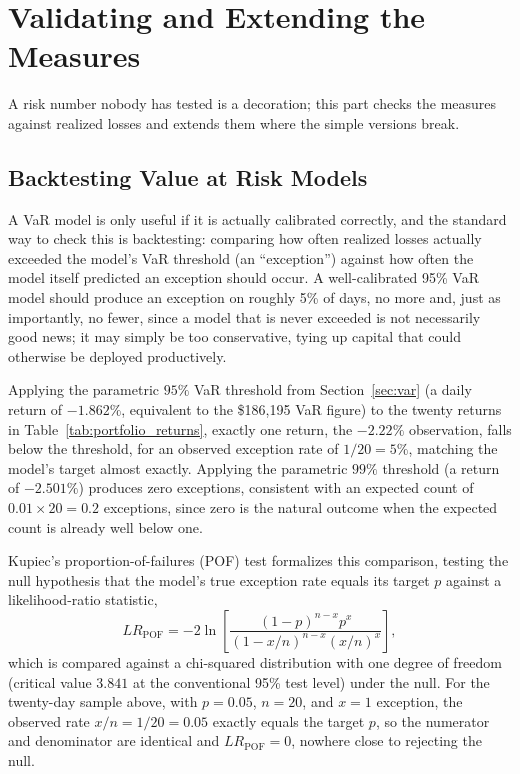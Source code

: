 \documentclass[../ai_in_finance]{subfiles}
\begin{document}
\section{Validating and Extending the Measures}

A risk number nobody has tested is a decoration; this part checks the measures against realized losses and extends them where the simple versions break.

\subsection{Backtesting Value at Risk Models}
\label{sec:backtesting-var}

A VaR model is only useful if it is actually calibrated correctly, and the standard way to check this is backtesting: comparing how often realized losses actually exceeded the model's VaR threshold (an ``exception'') against how often the model itself predicted an exception should occur. A well-calibrated 95\% VaR model should produce an exception on roughly 5\% of days, no more and, just as importantly, no fewer, since a model that is never exceeded is not necessarily good news; it may simply be too conservative, tying up capital that could otherwise be deployed productively.

Applying the parametric $95\%$ VaR threshold from Section~\ref{sec:var} (a daily return of $-1.862\%$, equivalent to the \$186,195 VaR figure) to the twenty returns in Table~\ref{tab:portfolio_returns}, exactly one return, the $-2.22\%$ observation, falls below the threshold, for an observed exception rate of $1/20 = 5\%$, matching the model's target almost exactly. Applying the parametric $99\%$ threshold (a return of $-2.501\%$) produces zero exceptions, consistent with an expected count of $0.01 \times 20 = 0.2$ exceptions, since zero is the natural outcome when the expected count is already well below one.

Kupiec's proportion-of-failures (POF) test formalizes this comparison, testing the null hypothesis that the model's true exception rate equals its target $p$ against a likelihood-ratio statistic,
\begin{equation*}
LR_{\text{POF}} = -2\ln\left[\frac{(1-p)^{n-x}p^x}{(1-x/n)^{n-x}(x/n)^x}\right],
\end{equation*}
which is compared against a chi-squared distribution with one degree of freedom (critical value $3.841$ at the conventional 95\% test level) under the null. For the twenty-day sample above, with $p=0.05$, $n=20$, and $x=1$ exception, the observed rate $x/n=1/20=0.05$ exactly equals the target $p$, so the numerator and denominator are identical and $LR_{\text{POF}}=0$, nowhere close to rejecting the null.
\end{document}
